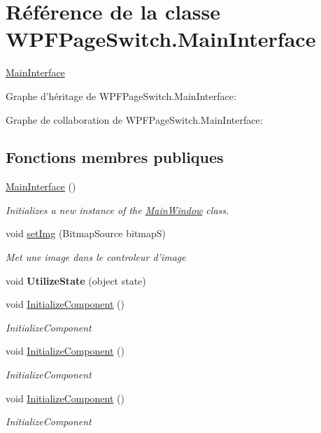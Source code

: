 \hypertarget{class_w_p_f_page_switch_1_1_main_interface}{\section{Référence de la classe W\+P\+F\+Page\+Switch.\+Main\+Interface}
\label{class_w_p_f_page_switch_1_1_main_interface}
}


\hyperlink{class_w_p_f_page_switch_1_1_main_interface}{Main\+Interface}  




Graphe d'héritage de W\+P\+F\+Page\+Switch.\+Main\+Interface\+:


Graphe de collaboration de W\+P\+F\+Page\+Switch.\+Main\+Interface\+:
\subsection*{Fonctions membres publiques}
\begin{DoxyCompactItemize}
\item 
\hyperlink{class_w_p_f_page_switch_1_1_main_interface_af78a7f81f1fb22fa9495fda3ecbcbdb5}{Main\+Interface} ()
\begin{DoxyCompactList}\small\item\em Initializes a new instance of the \hyperlink{class_w_p_f_page_switch_1_1_main_window}{Main\+Window} class. \end{DoxyCompactList}\item 
void \hyperlink{class_w_p_f_page_switch_1_1_main_interface_a30d3541e7a36cacb28251cf806d2d0ef}{set\+Img} (Bitmap\+Source bitmap\+S)
\begin{DoxyCompactList}\small\item\em Met une image dans le controleur d'image \end{DoxyCompactList}\item 
\hypertarget{class_w_p_f_page_switch_1_1_main_interface_ad3c57c28f09e16fea92ae048e38ee7a4}{void {\bfseries Utilize\+State} (object state)}\label{class_w_p_f_page_switch_1_1_main_interface_ad3c57c28f09e16fea92ae048e38ee7a4}

\item 
void \hyperlink{class_w_p_f_page_switch_1_1_main_interface_a94ae399430b10837e6c8d484bf093615}{Initialize\+Component} ()
\begin{DoxyCompactList}\small\item\em Initialize\+Component \end{DoxyCompactList}\item 
void \hyperlink{class_w_p_f_page_switch_1_1_main_interface_a94ae399430b10837e6c8d484bf093615}{Initialize\+Component} ()
\begin{DoxyCompactList}\small\item\em Initialize\+Component \end{DoxyCompactList}\item 
void \hyperlink{class_w_p_f_page_switch_1_1_main_interface_a94ae399430b10837e6c8d484bf093615}{Initialize\+Component} ()
\begin{DoxyCompactList}\small\item\em Initialize\+Component \end{DoxyCompactList}\end{DoxyCompactItemize}
